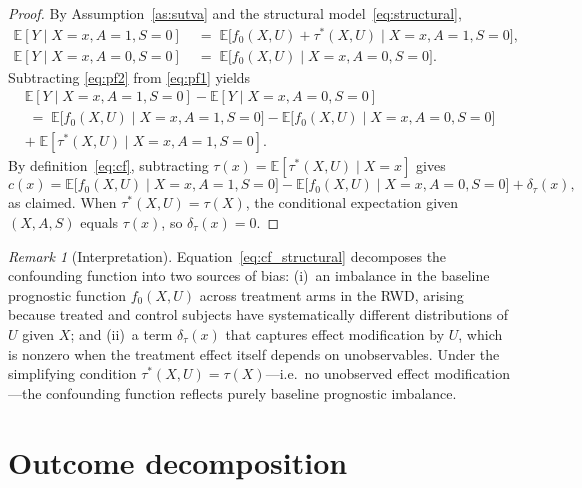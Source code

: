 \documentclass[11pt]{article}
\theoremstyle{plain}
\theoremstyle{definition}
\theoremstyle{remark}
\newcommand{\E}{\mathbb{E}}
\newcommand{\1}{\mathds{1}}
\theoremstyle{plain}
\theoremstyle{remark}
\newtheorem{remark}{Remark}
\newcommand{\CATE}{\tau}
\newcommand{\cf}{c}
\begin{document}
\begin{proof}
  By Assumption~\ref{as:sutva} and the structural model~\eqref{eq:structural},
  \begin{align}
    \E[Y \mid X{=}x, A{=}1, S{=}0] &\;=\; \E\bigl[f_0(X,U) + \CATE^*(X,U) \mid X{=}x, A{=}1, S{=}0\bigr], \label{eq:pf1}\\[4pt]
    \E[Y \mid X{=}x, A{=}0, S{=}0] &\;=\; \E\bigl[f_0(X,U) \mid X{=}x, A{=}0, S{=}0\bigr]. \label{eq:pf2}
  \end{align}
  Subtracting \eqref{eq:pf2} from \eqref{eq:pf1} yields
  \begin{multline*}
    \E[Y \mid X{=}x, A{=}1, S{=}0] - \E[Y \mid X{=}x, A{=}0, S{=}0] \\
    \;=\; \E\bigl[f_0(X,U) \mid X{=}x, A{=}1, S{=}0\bigr] - \E\bigl[f_0(X,U) \mid X{=}x, A{=}0, S{=}0\bigr] \\
    +\; \E[\CATE^*(X,U) \mid X{=}x, A{=}1, S{=}0].
  \end{multline*}
  By definition~\eqref{eq:cf}, subtracting $\CATE(x) = \E[\CATE^*(X,U) \mid X=x]$ gives
  \begin{equation*}
    \cf(x) = \E\bigl[f_0(X,U) \mid X{=}x, A{=}1, S{=}0\bigr] - \E\bigl[f_0(X,U) \mid X{=}x, A{=}0, S{=}0\bigr] + \delta_\tau(x),
  \end{equation*}
  as claimed. When $\CATE^*(X,U) = \CATE(X)$, the conditional expectation given $(X, A, S)$ equals $\CATE(x)$, so $\delta_\tau(x) = 0$.
\end{proof}

\begin{remark}[Interpretation]
  Equation~\eqref{eq:cf_structural} decomposes the confounding function into two sources of bias: (i)~an imbalance in the baseline prognostic function $f_0(X,U)$ across treatment arms in the RWD, arising because treated and control subjects have systematically different distributions of $U$ given $X$; and (ii)~a term $\delta_\tau(x)$ that captures effect modification by $U$, which is nonzero when the treatment effect itself depends on unobservables. Under the simplifying condition $\CATE^*(X,U) = \CATE(X)$---i.e.\ no unobserved effect modification---the confounding function reflects purely baseline prognostic imbalance.
\end{remark}

\section{Outcome decomposition}
\end{document}
